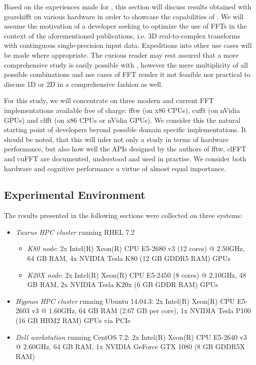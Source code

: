 Based on the experiences made for \cite{preibisch2014efficient, schmid2015real}, this section will discuss results obtained with gearshifft on various hardware in order to showcase the capabilities of \gearshifft{}. We will assume the motivation of a developer seeking to optimize the use of FFTs in the context of the aforementioned publications, i.e. 3D real-to-complex transforms with continguous single-precision input data. Expeditions into other use cases will be made where appropriate. The curious reader may rest assured that a more comprehensive study is easily possible with \gearshifft{}, however the mere multiplicity of all possible combinations and use cases of FFT render it not feasible nor practical to discuss 1D or 2D in a comprehensive fashion as well.

For this study, we will concentrate on three modern and current FFT implementations available free of charge: fftw (on x86 CPUs), cufft (on nVidia GPUs) and clfft (on x86 CPUs or nVidia GPUs). We consider this the natural starting point of developers beyond possible domain specific implementations. It should be noted, that this will infer not only a study in terms of hardware performance, but also how well the APIs designed by the authors of fftw, clFFT and cuFFT are documented, understood and used in practise. We consider both hardware and cognitive performance a virtue of almost equal importance.

\subsection{Experimental Environment}
\label{ssec:env}

The results presented in the following sections were collected on three systems:

\begin{itemize}
\item \emph{Taurus HPC cluster}\cite{taurus} running RHEL 7.2
  \begin{itemize}
  \item \emph{K80 node}: 2x Intel(R) Xeon(R) CPU E5-2680 v3 (12 cores) @ 2.50GHz, 64 GB RAM, 4x NVIDIA Tesla K80 (12 GB GDDR5 RAM) GPUs 
  \item \emph{K20X node}: 2x Intel(R) Xeon(R) CPU E5-2450 (8 cores) @ 2.10GHz, 48 GB RAM, 2x NVIDIA Tesla K20x (6 GB GDDR RAM) GPUs 
  \end{itemize}
\item \emph{Hypnos HPC cluster}\cite{hypnos} running Ubuntu 14.04.3:\newline
  2x Intel(R) Xeon(R) CPU E5-2603 v3 @ 1.60GHz, 64 GB RAM (2.67 GB per core), 1x NVIDIA Tesla P100 (16 GB HBM2 RAM) GPUs via PCIe 
\item  \emph{Dell workstation} running CentOS 7.2:\newline 
  2x Intel(R) Xeon(R) CPU E5-2640 v3 @ 2.60GHz, 64 GB RAM, 1x NVIDIA GeForce GTX 1080 (8 GB GDDR5X RAM)
\end{itemize}

